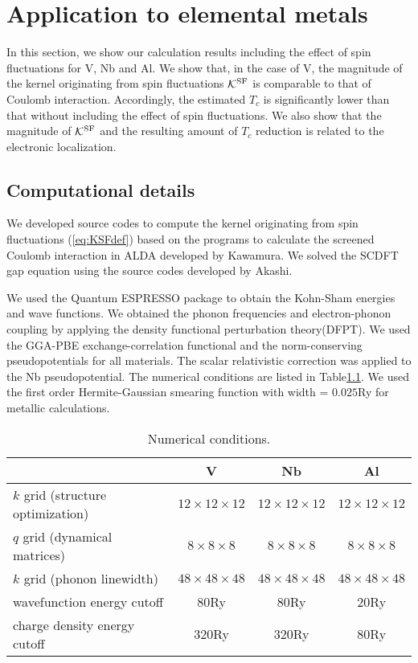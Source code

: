 

%
%
\chapter{Application to elemental metals}
\label{application}
In this section, we show our calculation results including the effect of spin fluctuations 
for V, Nb and Al. We show that, in the case of V, the magnitude of the kernel originating 
from spin fluctuations $\mathcal K^{\rm SF}$ is comparable to that of Coulomb interaction.
Accordingly, the estimated $T_{c}$ is significantly lower than that without including the
effect of spin fluctuations. We also show that the magnitude of $\mathcal K^{\rm SF}$ and the 
resulting amount of $T_{c}$ reduction is related to the electronic localization.

\section{Computational details}
We developed source codes to compute the kernel originating from spin fluctuations (\ref{eq:KSFdef}) 
based on the programs to calculate the screened Coulomb interaction in ALDA
developed by Kawamura\cite{KMurl,Kawamura2016}.
We solved the SCDFT gap equation using the source codes developed by Akashi\cite{RA2012,RA2015}.

We used the Quantum ESPRESSO package\cite{QE} to obtain the Kohn-Sham energies and wave functions.
We obtained the phonon frequencies and electron-phonon coupling by applying the density functional
perturbation theory(DFPT)\cite{DFPT}.
We used the GGA-PBE exchange-correlation functional\cite{GGAPBE} and the norm-conserving 
pseudopotentials\cite{normcons} for all materials. 
The scalar relativistic correction was applied to the Nb pseudopotential.
The numerical conditions are listed in Table\ref{tab:numcond}.
We used the first order Hermite-Gaussian smearing function\cite{Paxton1989} 
with width = $0.025$Ry for metallic calculations.

\begin{table}[hbtp]
	\centering
	\caption{Numerical conditions.}
	\begin{tabular}{lccc}
		\hline \hline
		& V & Nb & Al \\
		\hline
	$k$ grid (structure optimization) & $12\times12\times12$ & $12\times12\times12$ & $12\times12\times12$ \\
	$q$ grid (dynamical matrices) & $ 8\times8\times8$ & $8\times8\times8$ & $8\times8\times8$ \\
	$k$ grid (phonon linewidth) & $48\times48\times48$ & $48\times48\times48$ & $48\times48\times48$ \\
	wavefunction energy cutoff & 80Ry & 80Ry & 20Ry \\
	charge density energy cutoff & 320Ry & 320Ry & 80Ry \\
	\hline \hline
	\end{tabular}
	\label{tab:numcond}
\end{table}

